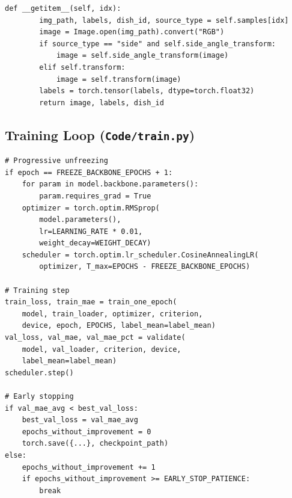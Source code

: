 \documentclass[11pt,a4paper]{article}
\begin{document}
\begin{lstlisting}[caption={Nutrition5kDataset --- Custom dataset for multi-view food images.}]
    def __getitem__(self, idx):
        img_path, labels, dish_id, source_type = self.samples[idx]
        image = Image.open(img_path).convert("RGB")
        if source_type == "side" and self.side_angle_transform:
            image = self.side_angle_transform(image)
        elif self.transform:
            image = self.transform(image)
        labels = torch.tensor(labels, dtype=torch.float32)
        return image, labels, dish_id
\end{lstlisting}

\subsection{Training Loop (\texttt{Code/train.py})}

\begin{lstlisting}[caption={Main training loop with progressive unfreezing and early stopping.}]
# Progressive unfreezing
if epoch == FREEZE_BACKBONE_EPOCHS + 1:
    for param in model.backbone.parameters():
        param.requires_grad = True
    optimizer = torch.optim.RMSprop(
        model.parameters(),
        lr=LEARNING_RATE * 0.01,
        weight_decay=WEIGHT_DECAY)
    scheduler = torch.optim.lr_scheduler.CosineAnnealingLR(
        optimizer, T_max=EPOCHS - FREEZE_BACKBONE_EPOCHS)

# Training step
train_loss, train_mae = train_one_epoch(
    model, train_loader, optimizer, criterion,
    device, epoch, EPOCHS, label_mean=label_mean)
val_loss, val_mae, val_mae_pct = validate(
    model, val_loader, criterion, device,
    label_mean=label_mean)
scheduler.step()

# Early stopping
if val_mae_avg < best_val_loss:
    best_val_loss = val_mae_avg
    epochs_without_improvement = 0
    torch.save({...}, checkpoint_path)
else:
    epochs_without_improvement += 1
    if epochs_without_improvement >= EARLY_STOP_PATIENCE:
        break
\end{lstlisting}
\end{document}
